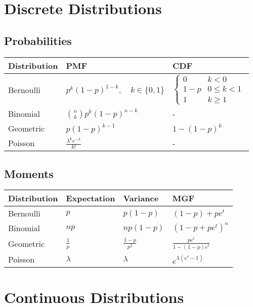 


\section*{Discrete Distributions}
\subsection*{Probabilities}
\begin{center}
  \begin{tabularx}{\textwidth}{XXX}
	\toprule
	Distribution & PMF & CDF\\
	\midrule
	Bernoulli & $p^k (1-p)^{1-k}, \quad k\in\{0, 1\}$ & $\begin{cases} 0 & k < 0 \\ 1 - p & 0 \leq k < 1 \\ 1 & k \geq 1 \end{cases}$\\
	Binomial & $ {n \choose k} p^k (1-p)^{n-k} $ & - \\
	Geometric & $ p(1-p)^{k-1}$ & $1 - (1 - p)^k$\\
	Poisson & $\frac{\lambda^ke^{-\lambda}}{k!}$ & -
  \end{tabularx}
\end{center}

\subsection*{Moments}
\begin{center}
  \begin{tabularx}{\textwidth}{XXXX}
	\toprule
	Distribution & Expectation & Variance & MGF\\
	\midrule
	Bernoulli & $p$ & $p(1-p)$ & $(1-p) + pe^t$\\
	Binomial & $np$ & $np(1-p)$ & $(1-p + pe^t)^n$\\
	Geometric & $\frac{1}{p}$ & $\frac{1-p}{p^2}$ & $\frac{pe^t}{1-(1-p)e^t}$\\
	Poisson & $\lambda$ & $\lambda$ & $e^{\lambda(e^t - 1)}$
  \end{tabularx}
\end{center}

\section*{Continuous Distributions}
